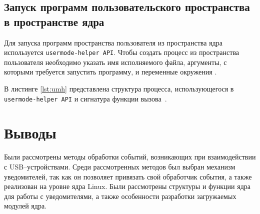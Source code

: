\subsection{Запуск программ пользовательского пространства в пространстве ядра}

Для запуска программ пространства пользователя из пространства ядра используется \texttt{usermode-helper API}. Чтобы создать процесс из пространства пользователя необходимо указать имя исполняемого файла, аргументы, с которыми требуется запустить программу, и переменные окружения \cite{umhelper}.

В листинге \ref{lst:umh} представлена структура процесса, использующегося в \texttt{usermode-helper API} и сигнатура функции вызова~\cite{umh}.

    
\section*{Выводы}

Были рассмотрены методы обработки событий, возникающих при взаимодействии с USB--устройствами. Среди рассмотренных методов был выбран механизм уведомителей, так как он позволяет привязать свой обработчик события, а также реализован на уровне ядра Linux. Были рассмотрены структуры и функции ядра для работы с уведомителями, а также особенности разработки загружаемых модулей ядра.
